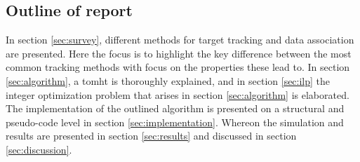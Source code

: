 \subsection{Outline of report}
In section \ref{sec:survey}, different methods for target tracking and data association are presented. Here the focus is to highlight the key difference between the most common tracking methods with focus on the properties these lead to. In section \ref{sec:algorithm}, a \gls{tomht} is thoroughly explained, and in section \ref{sec:ilp} the integer optimization problem that arises in section \ref{sec:algorithm} is elaborated. The implementation of the outlined algorithm is presented on a structural and pseudo-code level in section \ref{sec:implementation}. Whereon the simulation and results are presented in section \ref{sec:results} and discussed in section \ref{sec:discussion}.